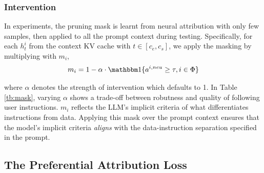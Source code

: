\subsubsection{Intervention}

In experiments, the pruning mask is learnt from neural attribution with only few samples, then applied to all the prompt context during testing.
Specifically, 
for each $h_t^i$ from the context KV cache with $t\in[c_e,c_s]$, we apply the masking by multiplying with $m_i$,
%
\begin{equation} \label{eq: mask}
    m_i = 1 - \alpha\cdot \mathbbm 1\{a^{i,neu}\geq\tau, i\in\Phi\}
\end{equation}
%

\noindent where $\alpha$ denotes the strength of intervention which defaults to 1. 
In Table \ref{tb:mask}, varying $\alpha$ shows a trade-off between robutness and quality of following user instructions.
$m_i$ reflects the LLM's implicit criteria of what differentiates instructions from data. 
Applying this mask over the prompt context ensures that the model's implicit criteria \textit{aligns} with the 
data-instruction separation specified in the prompt.




\subsection{The Preferential Attribution Loss} \label{sec: loss}


